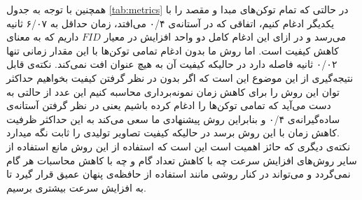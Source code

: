 همچنین با توجه به جدول \ref{tab:metrics} در حالتی که تمام توکن‌های مبدا و مقصد را با یکدیگر ادغام کنیم، اتفاقی که در آستانه‌ی ۰/۴ می‌افتد، زمان حداقل به ۶/۰۷ ثانیه می‌رسد و در ازای این ادغام کامل دو واحد افزایش در معیار $FID$  داریم که به معنای کاهش کیفیت است. اما روش ما بدون ادغام تمامی توکن‌ها با این مقدار زمانی تنها ۰/۰۲ ثانیه فاصله دارد در حالیکه کیفیت آن به هیچ عنوان افت نمی‌کند. نکته‌ی قابل نتیجه‌گیری از این موضوع این است که اگر بدون در نظر گرفتن کیفیت بخواهیم حداکثر توان این روش را برای کاهش زمان نمونه‌برداری محاسبه کنیم این عدد از حالتی به دست می‌آید که تمامی توکن‌ها را ادغام کرده باشیم یعنی در نظر گرفتن آستانه‌ی ساده‌گیرانه‌ی ۰/۴ و بنابراین روش پیشنهادی ما سعی می‌کند به این حداکثر ظرفیت کاهش زمان با این روش برسد در حالیکه کیفیت تصاویر تولیدی را ثابت نگه میدارد.
\\
نکته‌ی دیگری که حائز اهمیت است این است که استفاده از این روش مانع استفاده از سایر روش‌های افزایش سرعت چه با کاهش تعداد گام و چه با کاهش محاسبات هر گام نمی‌گردد و می‌تواند در کنار روشی مانند استفاده از حافظه‌ی پنهان عمیق قرار گیرد تا به افزایش سرعت بیشتری برسیم.





